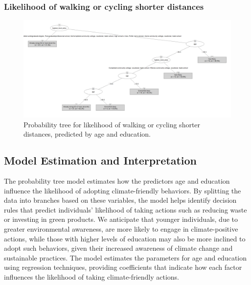 \documentclass[
  letterpaper,
  DIV=11,
  numbers=noendperiod]{scrartcl}
\begin{document}
\subsubsection{Likelihood of walking or cycling shorter
distances}\label{likelihood-of-walking-or-cycling-shorter-distances}

\begin{figure}[H]

{\centering \includegraphics[width=10.67in,height=\textheight]{../data/04-model_data/short_distance_tree.png}

}

\caption{Probability tree for likelihood of walking or cycling shorter
distances, predicted by age and education.}

\end{figure}%

\subsection{Model Estimation and
Interpretation}\label{model-estimation-and-interpretation}

The probability tree model estimates how the predictors age and
education influence the likelihood of adopting climate-friendly
behaviors. By splitting the data into branches based on these variables,
the model helps identify decision rules that predict individuals'
likelihood of taking actions such as reducing waste or investing in
green products. We anticipate that younger individuals, due to greater
environmental awareness, are more likely to engage in climate-positive
actions, while those with higher levels of education may also be more
inclined to adopt such behaviors, given their increased awareness of
climate change and sustainable practices. The model estimates the
parameters for age and education using regression techniques, providing
coefficients that indicate how each factor influences the likelihood of
taking climate-friendly actions.
\end{document}
